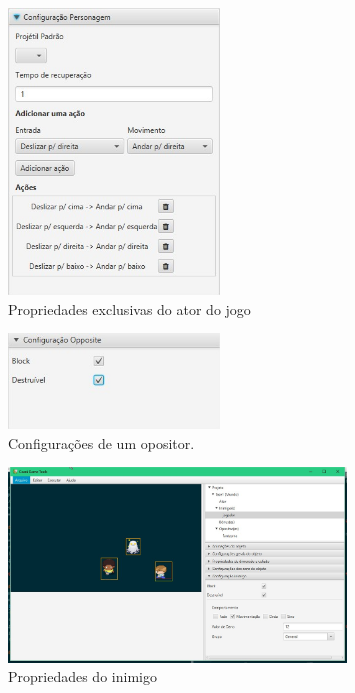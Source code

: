 \documentclass[12pt,oneside,openright,a4paper,english,brazil,sumario=tradicional]{abntex2}
\begin{document}
\begin{anexosenv}
   \begin{figure}[H]
   \centering
   \includegraphics[width=0.5\textwidth]{images/ator_props.jpg}
   \caption{Propriedades exclusivas do ator do jogo}
   \label{fig:ator_props}
   \end{figure}

   \begin{figure}[H]
   \centering
   \includegraphics[width=0.5\textwidth]{images/opositor_props.jpg}
   \caption{Configurações de um opositor.}
   \label{fig:opositor_props}
   \end{figure}

   \begin{figure}[H]
   \centering
   \includegraphics[width=0.8\textwidth]{images/inimigos_props.jpg}
   \caption{Propriedades do inimigo}
   \label{fig:inimigos_props}
   \end{figure}


\end{anexosenv}
\end{document}
